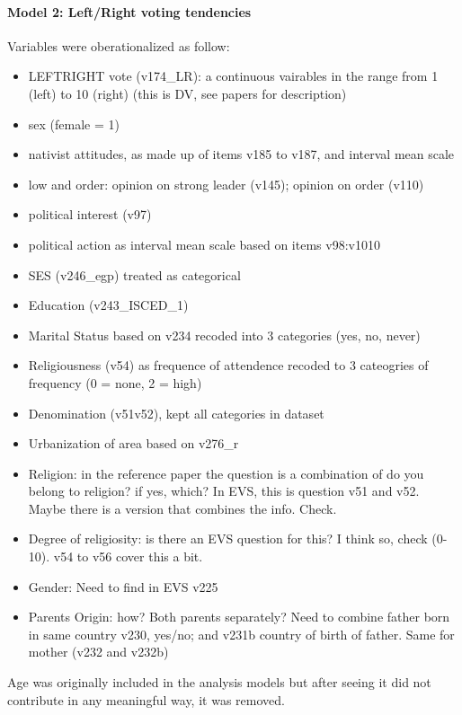 \paragraph{Model 2: Left/Right voting tendencies}

Variables were oberationalized as follow:
\begin{itemize}
	\item LEFT\/RIGHT vote (v174\_LR): a continuous vairables in the range from 1 (left) to 10 (right)
		(this is DV, see papers for description)
	\item sex (female = 1)
	\item nativist attitudes, as made up of items v185 to v187, and interval mean scale
	\item low and order: opinion on strong leader (v145); opinion on order (v110)
	\item political interest (v97)
	\item political action as interval mean scale based on items v98:v1010
	\item SES (v246\_egp) treated as categorical
	\item Education (v243\_ISCED\_1)
	\item Marital Status based on v234 recoded into 3 categories (yes, no, never)
	\item Religiousness (v54) as frequence of attendence recoded to 3 cateogries of frequency (0 = none, 2 = high)
	\item Denomination (v51v52), kept all categories in dataset
	\item Urbanization of area based on v276\_r		
	\item Religion: in the reference paper the question is a combination of do you belong to religion? if yes, which?
		In EVS, this is question v51 and v52. Maybe there is a version that combines the info. Check.
	\item Degree of religiosity: is there an EVS question for this? I think so, check (0-10). v54 to v56 cover this a bit.
	\item Gender: Need to find in EVS v225
	\item Parents Origin: how? Both parents separately? Need to combine father born in same country v230, yes/no; and 
		v231b country of birth of father. Same for mother (v232 and v232b)
\end{itemize}

Age was originally included in the analysis models but after seeing it did not contribute 
in any meaningful way, it was removed.

